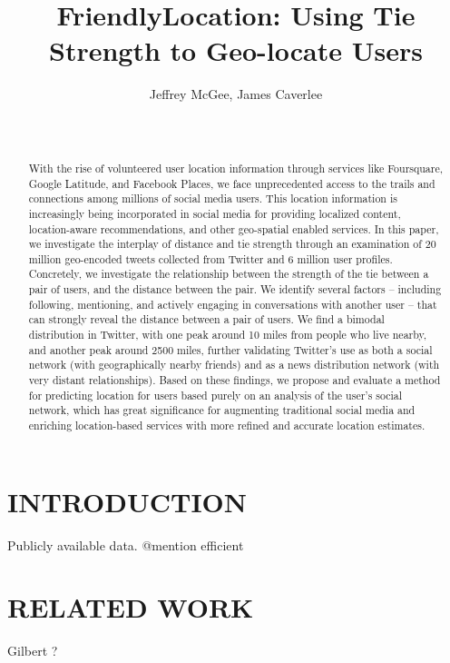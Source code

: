 \documentclass{sig-alternate}
\title{FriendlyLocation: Using Tie Strength to Geo-locate Users
}
\author{
    \alignauthor Jeffrey McGee, James Caverlee\\
    \affaddr{Department of Computer Science and Engineering, Texas A\&M
    University} \\
    \affaddr{ College Station, TX 77845 USA} \\
    \email{jeffamcgee@tamu.edu, caverlee@cse.tamu.edu}
}
\begin{document}
\maketitle
\begin{abstract}
With the rise of volunteered user location information through services like
Foursquare, Google Latitude, and Facebook Places, we face unprecedented access
to the trails and connections among millions of social media users. This
location information is increasingly being incorporated in social media for
providing localized content, location-aware recommendations, and other
geo-spatial enabled services. In this paper, we investigate the interplay of
distance and tie strength through an examination of 20 million geo-encoded
tweets collected from Twitter and 6 million user profiles. Concretely, we
investigate the relationship between the strength of the tie between a pair of
users, and the distance between the pair. We identify several factors --
including following, mentioning, and actively engaging in conversations with
another user -- that can strongly reveal the distance between a pair of users.
We find a bimodal distribution in Twitter, with one peak around 10 miles from
people who live nearby, and another peak around 2500 miles, further validating
Twitter's use as both a social network (with geographically nearby friends) and
as a news distribution network (with very distant relationships). Based on
these findings, we propose and evaluate a method for predicting location for
users based purely on an analysis of the user's social network, which has great
significance for augmenting traditional social media and enriching
location-based services with more refined and accurate location estimates.

\end{abstract}




\section{INTRODUCTION}



Publicly available data.
@mention
efficient


\section{RELATED WORK}
\cite{scellato2011socio}
\cite{scellato2010distance}
\cite{backstrom2010find}
\cite{cheng2010you}
Gilbert ?
\end{document}
